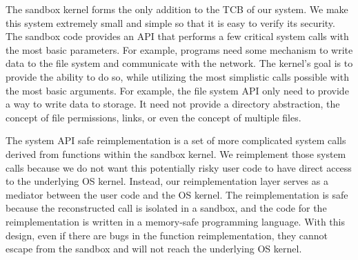 The sandbox kernel forms the only addition to the TCB of our system.  We
make this system extremely small and simple so that it is easy to verify its
security. 
 The sandbox code provides an API that performs
a few critical system calls with the most basic parameters.  For example,
programs need some mechanism to write data to the file system
and communicate with the network.  The kernel's goal is to provide the ability
to do so, while utilizing the most simplistic calls possible with the most
basic arguments. For example, the file system API only need to provide a way
to write data to storage.  It need not provide a directory abstraction, the
concept of file permissions, links, or even the concept of multiple files.


The system API safe reimplementation is a set of more complicated system calls
derived from functions within the sandbox kernel. 
We reimplement those system calls because we do not want this potentially risky user code
to have direct access to the underlying OS kernel.
Instead, our reimplementation layer serves as a mediator between the user code
and the OS kernel. The reimplementation is safe
because the reconstructed call is isolated in a sandbox, and the code for the
reimplementation is written in a memory-safe programming language.
With this design, even if there are bugs in the function reimplementation,
they cannot escape from the sandbox and will not reach the underlying OS kernel.

